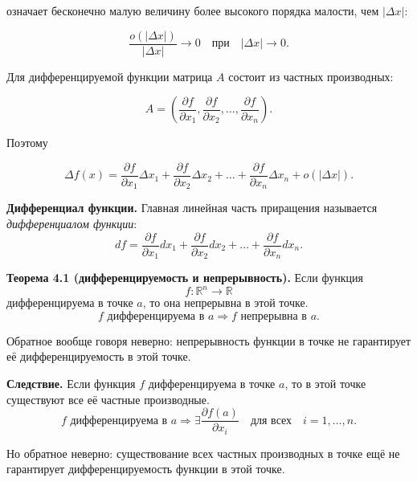 \documentclass[a4paper,12pt]{article}
\begin{document}
означает бесконечно малую величину более высокого порядка малости, чем $|\Delta x|$:

\[
\frac{o(|\Delta x|)}{|\Delta x|}
\to 0
\quad
\text{при}
\quad
|\Delta x|\to 0.
\]

Для дифференцируемой функции матрица $A$ состоит из частных производных:

\[
A
=
\left(
\frac{\partial f}{\partial x_1},
\frac{\partial f}{\partial x_2},
\ldots,
\frac{\partial f}{\partial x_n}
\right).
\]

Поэтому

\[
\Delta f(x)
=
\frac{\partial f}{\partial x_1}\Delta x_1
+
\frac{\partial f}{\partial x_2}\Delta x_2
+
\ldots
+
\frac{\partial f}{\partial x_n}\Delta x_n
+
o(|\Delta x|).
\]

\begin{definitionbox}
\textbf{Дифференциал функции.}
Главная линейная часть приращения называется \textit{дифференциалом функции}:
\[
df
=
\frac{\partial f}{\partial x_1}dx_1
+
\frac{\partial f}{\partial x_2}dx_2
+
\ldots
+
\frac{\partial f}{\partial x_n}dx_n.
\]
\end{definitionbox}

\begin{theorembox}
\textbf{Теорема 4.1 (дифференцируемость и непрерывность).}
Если функция
\[
f:\mathbb{R}^n\to\mathbb{R}
\]
дифференцируема в точке $a$, то она непрерывна в этой точке.
\[
f \text{ дифференцируема в } a
\Rightarrow
f \text{ непрерывна в } a.
\]
\end{theorembox}

Обратное вообще говоря неверно: непрерывность функции в точке не гарантирует её дифференцируемость в этой точке.

\begin{theorembox}
\textbf{Следствие.}
Если функция $f$ дифференцируема в точке $a$, то в этой точке существуют все её частные производные.
\[
f \text{ дифференцируема в } a
\Rightarrow
\exists
\frac{\partial f(a)}{\partial x_i}
\quad
\text{для всех}
\quad
i=1,\ldots,n.
\]
\end{theorembox}

Но обратное неверно: существование всех частных производных в точке ещё не гарантирует дифференцируемость функции в этой точке.
\end{document}
